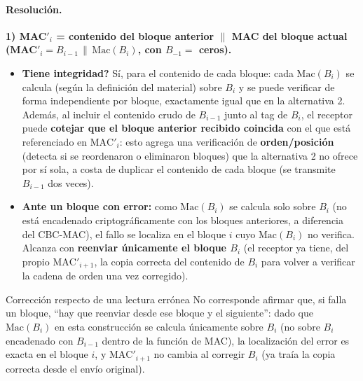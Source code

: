 \paragraph{Resolución.}

\textbf{1) MAC$'_i$ = contenido del bloque anterior $\|$ MAC del bloque actual
(MAC$'_i = B_{i-1}\,\|\,\mathrm{Mac}(B_i)$, con $B_{-1}=$ ceros).}
\begin{itemize}
  \item \textbf{\textquestiondown{}Tiene integridad?} Sí, para el contenido de cada bloque: cada
  $\mathrm{Mac}(B_i)$ se calcula (según la definición del material) sobre $B_i$ y se
  puede verificar de forma independiente por bloque, exactamente igual que en la
  alternativa 2. Además, al incluir el contenido crudo de $B_{i-1}$ junto al tag de
  $B_i$, el receptor puede \textbf{cotejar que el bloque anterior recibido coincida}
  con el que está referenciado en $\mathrm{MAC}'_i$: esto agrega una verificación de
  \textbf{orden/posición} (detecta si se reordenaron o eliminaron bloques) que la
  alternativa 2 no ofrece por sí sola, a costa de duplicar el contenido de cada bloque
  (se transmite $B_{i-1}$ dos veces).
  \item \textbf{Ante un bloque con error:} como $\mathrm{Mac}(B_i)$ se calcula solo
  sobre $B_i$ (no está encadenado criptográficamente con los bloques anteriores, a
  diferencia del CBC-MAC), el fallo se localiza en el bloque $i$ cuyo
  $\mathrm{Mac}(B_i)$ no verifica. Alcanza con \textbf{reenviar únicamente el bloque
  $B_i$} (el receptor ya tiene, del propio $\mathrm{MAC}'_{i+1}$, la copia correcta del
  contenido de $B_i$ para volver a verificar la cadena de orden una vez corregido).
\end{itemize}

\begin{warnbox}{Corrección respecto de una lectura errónea}
No corresponde afirmar que, si falla un bloque, ``hay que reenviar desde ese bloque y el
siguiente'': dado que $\mathrm{Mac}(B_i)$ en esta construcción se calcula únicamente
sobre $B_i$ (no sobre $B_i$ encadenado con $B_{i-1}$ dentro de la función de MAC), la
localización del error es exacta en el bloque $i$, y $\mathrm{MAC}'_{i+1}$ no cambia
al corregir $B_i$ (ya traía la copia correcta desde el envío original).
\end{warnbox}

